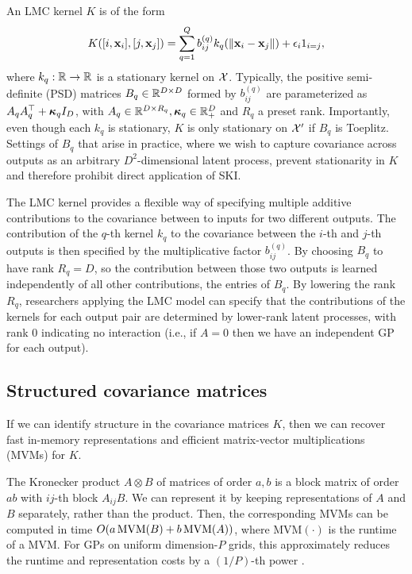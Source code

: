 \documentclass{article}
\begin{document}
An LMC kernel $K$ is of the form 
\begin{align}
K([i,\textbf{x}_i],[j,\textbf{x}_j])=\sum_{q=1}^Qb_{ij}^{(q)}k_q(\left\| \textbf{x}_i-\textbf{x}_j \right\|)+\epsilon_i1_{i=j},\label{lmcpointwise}
\end{align} 
where $k_q:\mathbb{R}\rightarrow\mathbb{R}$ is a stationary kernel on $\mathcal{X}$. Typically, the positive semi-definite (PSD) matrices $B_q\in\mathbb{R}^{D\times D}$ formed by $b_{ij}^{(q)}$ are parameterized as $A_qA_q^\top+{\boldsymbol\kappa}_q I_D$, with $A_q\in\mathbb{R}^{D\times R_q},{\boldsymbol\kappa}_q\in\mathbb{R}_+^D$ and $R_q$ a preset rank. Importantly, even though each $k_q$ is stationary, $K$ is only stationary on $\mathcal{X}'$ if $B_q$ is Toeplitz. Settings of $B_q$ that arise in practice, where we wish to capture covariance across outputs as an arbitrary $D^2$-dimensional latent process, prevent stationarity in $K$ and therefore prohibit direct application of SKI.

The LMC kernel provides a flexible way of specifying multiple additive contributions to the covariance between to inputs for two different outputs. The contribution of the $q$-th kernel $k_q$ to the covariance between the $i$-th and $j$-th outputs is then specified by the multiplicative factor $b_{ij}^{(q)}$. By choosing $B_q$ to have rank $R_q=D$, so the contribution between those two outputs is learned independently of all other contributions, the entries of $B_q$. By lowering the rank $R_q$, researchers applying the LMC model can specify that the contributions of the kernels for each output pair are determined by lower-rank latent processes, with rank 0 indicating no interaction (i.e., if $A=0$ then we have an independent GP for each output).

\subsection{Structured covariance matrices}

If we can identify structure in the covariance matrices $K$, then we can recover fast in-memory representations and efficient matrix-vector multiplications (MVMs) for $K$.

The Kronecker product $A\otimes B$ of matrices of order $a,b$ is a block matrix of order $ab$ with $ij$-th block $A_{ij}B$. We can represent it by keeping representations of $A$ and $B$ separately, rather than the product. Then, the corresponding MVMs can be computed in time $O(a\operatorname{MVM}(B)+b\operatorname{MVM}(A))$, where $\text{MVM}(\cdot)$ is the runtime of a MVM. For GPs on uniform dimension-$P$ grids, this approximately reduces the runtime and representation costs by a $(1/P)$-th power \cite{gilboa2015scaling}.
\end{document}
